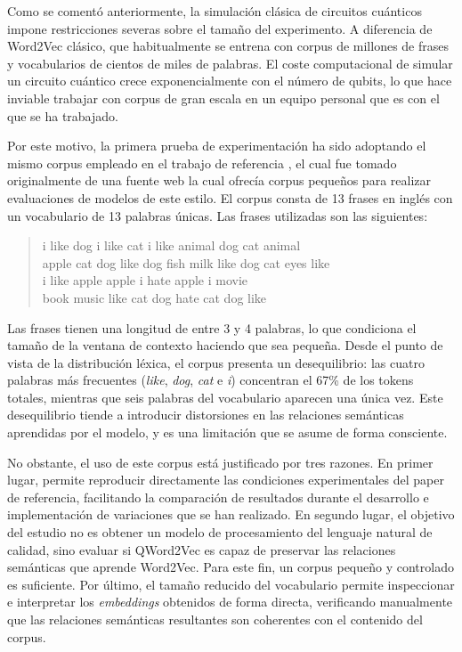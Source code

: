 Como se comentó anteriormente, la simulación clásica de circuitos cuánticos impone restricciones severas sobre el tamaño del experimento. A diferencia de Word2Vec clásico, que habitualmente se entrena con corpus de millones de frases y vocabularios de cientos de miles de palabras. El coste computacional de simular un circuito cuántico crece exponencialmente con el número de qubits, lo que hace inviable trabajar con corpus de gran escala en un equipo personal que es con el que se ha trabajado.

Por este motivo, la primera prueba de experimentación ha sido adoptando el mismo corpus empleado en el trabajo de referencia \cite{ohno_qword2vec_2025}, el cual fue tomado originalmente de una fuente web la cual ofrecía corpus pequeños para realizar evaluaciones de modelos de este estilo. El corpus consta de 13 frases en inglés con un vocabulario de 13 palabras únicas. Las frases utilizadas son las siguientes:

\begin{quote}
  \ttfamily
  i like dog \quad i like cat \quad i like animal \quad dog cat animal \\
  apple cat dog like \quad dog fish milk like \quad dog cat eyes like \\
  i like apple \quad apple i hate \quad apple i movie \\
  book music like \quad cat dog hate \quad cat dog like
\end{quote}

Las frases tienen una longitud de entre 3 y 4 palabras, lo que condiciona el tamaño de la ventana de contexto haciendo que sea pequeña. Desde el punto de vista de la distribución léxica, el corpus presenta un desequilibrio: las cuatro palabras más frecuentes (\textit{like}, \textit{dog}, \textit{cat} e \textit{i}) concentran el 67\% de los tokens totales, mientras que seis palabras del vocabulario aparecen una única vez. Este desequilibrio tiende a introducir distorsiones en las relaciones semánticas aprendidas por el modelo, y es una limitación que se asume de forma consciente.

No obstante, el uso de este corpus está justificado por tres razones. En primer lugar, permite reproducir directamente las condiciones experimentales del paper de referencia, facilitando la comparación de resultados durante el desarrollo e implementación de variaciones que se han realizado. En segundo lugar, el objetivo del estudio no es obtener un modelo de procesamiento del lenguaje natural de calidad, sino evaluar si QWord2Vec es capaz de preservar las relaciones semánticas que aprende Word2Vec. Para este fin, un corpus pequeño y controlado es suficiente. Por último, el tamaño reducido del vocabulario permite inspeccionar e interpretar los \textit{embeddings} obtenidos de forma directa, verificando manualmente que las relaciones semánticas resultantes son coherentes con el contenido del corpus.

